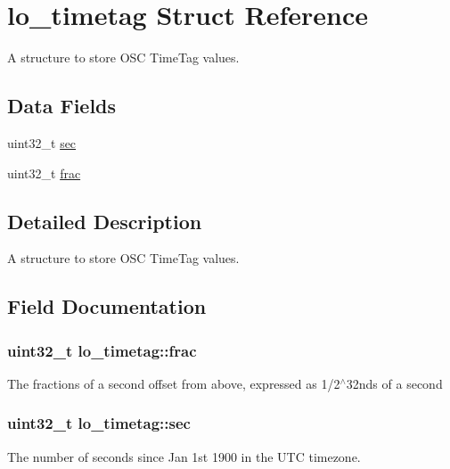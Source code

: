 \hypertarget{structlo__timetag}{\section{lo\+\_\+timetag Struct Reference}
\label{structlo__timetag}
}


A structure to store O\+S\+C Time\+Tag values.  


\subsection*{Data Fields}
\begin{DoxyCompactItemize}
\item 
uint32\+\_\+t \hyperlink{structlo__timetag_a917e786d87a5304c5e7ea4d3c44f7cf4}{sec}
\item 
uint32\+\_\+t \hyperlink{structlo__timetag_a1acce1a3dd765a15c47f6eb76cb96c27}{frac}
\end{DoxyCompactItemize}


\subsection{Detailed Description}
A structure to store O\+S\+C Time\+Tag values. 

\subsection{Field Documentation}
\hypertarget{structlo__timetag_a1acce1a3dd765a15c47f6eb76cb96c27}{
\subsubsection[{frac}]{\setlength{\rightskip}{0pt plus 5cm}uint32\+\_\+t lo\+\_\+timetag\+::frac}}\label{structlo__timetag_a1acce1a3dd765a15c47f6eb76cb96c27}
The fractions of a second offset from above, expressed as 1/2$^\wedge$32nds of a second \hypertarget{structlo__timetag_a917e786d87a5304c5e7ea4d3c44f7cf4}{
\subsubsection[{sec}]{\setlength{\rightskip}{0pt plus 5cm}uint32\+\_\+t lo\+\_\+timetag\+::sec}}\label{structlo__timetag_a917e786d87a5304c5e7ea4d3c44f7cf4}
The number of seconds since Jan 1st 1900 in the U\+T\+C timezone. 